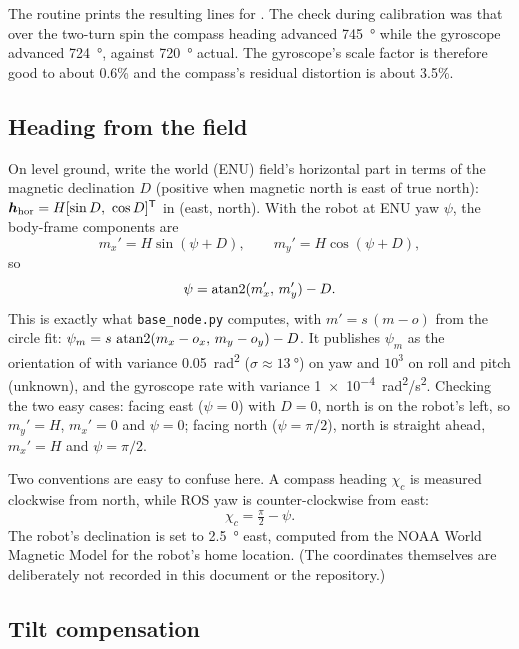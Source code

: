 The routine prints the resulting lines for . The check during
calibration was that over the two-turn spin the compass heading advanced
\SI{745}{\degree} while the gyroscope advanced \SI{724}{\degree}, against
\SI{720}{\degree} actual. The gyroscope's scale factor is therefore good to
about 0.6\% and the compass's residual distortion is about 3.5\%.

\subsection{Heading from the field}

On level ground, write the world (ENU) field's horizontal part in terms of the
magnetic declination $D$ (positive when magnetic north is east of true north):
$\bm h_{\mathrm{hor}} = H[\sin D,\ \cos D]^{\mathsf T}$ in (east, north). With the robot
at ENU yaw $\psi$, the body-frame components are
\begin{equation}
m_x' = H\sin(\psi+D),\qquad m_y' = H\cos(\psi+D),
\end{equation}
so
\begin{equation}\label{eq:magyaw}
\psi = \operatorname{atan2}(m_x',\,m_y') - D .
\end{equation}
This is exactly what \texttt{base\_node.py} computes, with
$m'=s\,(m-o)$ from the circle fit:
$\psi_m = s\,\operatorname{atan2}(m_x-o_x,\,m_y-o_y)-D$. It publishes $\psi_m$ as the
orientation of  with variance \SI{0.05}{rad^2}
($\sigma\approx\SI{13}{\degree}$) on yaw and $10^3$ on roll and pitch (unknown),
and the gyroscope rate with variance \SI{1e-4}{rad^2/s^2}.
Checking the two easy cases: facing east ($\psi=0$) with $D=0$, north is on
the robot's left, so $m_y'=H$, $m_x'=0$ and $\psi=0$; facing north
($\psi=\pi/2$), north is straight ahead, $m_x'=H$ and $\psi=\pi/2$.

Two conventions are easy to confuse here. A compass heading $\chi_c$ is measured
clockwise from north, while ROS yaw is counter-clockwise from east:
\begin{equation}
\chi_c = \tfrac{\pi}{2}-\psi .
\end{equation}
The robot's declination is set to \SI{2.5}{\degree} east, computed from the
NOAA World Magnetic Model \cite{wmm2025} for the robot's home location. (The
coordinates themselves are deliberately not recorded in this document or the
repository.)

\subsection{Tilt compensation}

